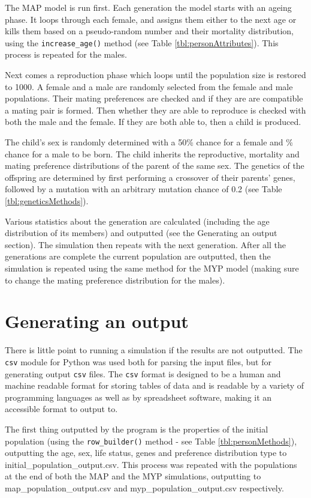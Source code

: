 \documentclass[authoryearcitations]{UoYCSproject}
\begin{document}
The MAP model is run first. Each generation the model starts with an ageing phase. It loops through each female, and assigns them either to the next age or kills them based on a pseudo-random number and their mortality distribution, using the \texttt{increase\_age()} method (see Table \ref{tbl:personAttributes}). This process is repeated for the males.

Next comes a reproduction phase which loops until the population size is restored to 1000. A female and a male are randomly selected from the female and male populations. Their mating preferences are checked and if they are are compatible a mating pair is formed. Then whether they are able to reproduce is checked with both the male and the female. If they are both able to, then a child is produced.

The child's sex is randomly determined with a 50\% chance for a female and \% chance for a male to be born. The child inherits the reproductive, mortality and mating preference distributions of the parent of the same sex. The genetics of the offspring are determined by first performing a crossover of their parents' genes, followed by a mutation with an arbitrary mutation chance of 0.2 (see Table \ref{tbl:geneticsMethods}).

Various statistics about the generation are calculated (including the age distribution of its members) and outputted (see the Generating an output section). The simulation then repeats with the next generation. After all the generations are complete the current population are outputted, then the simulation is repeated using the same method for the MYP model (making sure to change the mating preference distribution for the males).

\section{Generating an output}
There is little point to running a simulation if the results are not outputted. The \texttt{csv} module for Python was used both for parsing the input files, but for generating output \texttt{csv} files. The \texttt{csv} format is designed to be a human and machine readable format for storing tables of data and is readable by a variety of programming languages as well as by spreadsheet software, making it an accessible format to output to.

The first thing outputted by the program is the properties of the initial population (using the \texttt{row\_builder()} method - see Table \ref{tbl:personMethods}), outputting the age, sex, life status, genes and preference distribution type to initial\_population\_output.csv. This process was repeated with the populations at the end of both the MAP and the MYP simulations, outputting to map\_population\_output.csv and myp\_population\_output.csv respectively.
\end{document}
